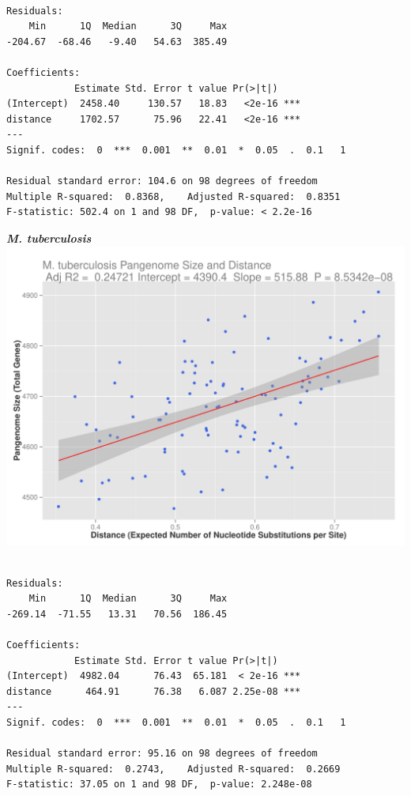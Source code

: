 \documentclass[12pt]{article}
\begin{document}
\begin{lstlisting}

Residuals:
    Min      1Q  Median      3Q     Max 
-204.67  -68.46   -9.40   54.63  385.49 

Coefficients:
            Estimate Std. Error t value Pr(>|t|)    
(Intercept)  2458.40     130.57   18.83   <2e-16 ***
distance     1702.57      75.96   22.41   <2e-16 ***
---
Signif. codes:  0  ***  0.001  **  0.01  *  0.05  .  0.1   1

Residual standard error: 104.6 on 98 degrees of freedom
Multiple R-squared:  0.8368,    Adjusted R-squared:  0.8351 
F-statistic: 502.4 on 1 and 98 DF,  p-value: < 2.2e-16

\end{lstlisting}


{\large \textbf{\textit{M. tuberculosis}}\\}
\includegraphics[width=\textwidth]{tuber_plot.pdf}

\begin{lstlisting}

Residuals:
    Min      1Q  Median      3Q     Max 
-269.14  -71.55   13.31   70.56  186.45 

Coefficients:
            Estimate Std. Error t value Pr(>|t|)    
(Intercept)  4982.04      76.43  65.181  < 2e-16 ***
distance      464.91      76.38   6.087 2.25e-08 ***
---
Signif. codes:  0  ***  0.001  **  0.01  *  0.05  .  0.1   1

Residual standard error: 95.16 on 98 degrees of freedom
Multiple R-squared:  0.2743,    Adjusted R-squared:  0.2669 
F-statistic: 37.05 on 1 and 98 DF,  p-value: 2.248e-08

\end{lstlisting}
\end{document}
